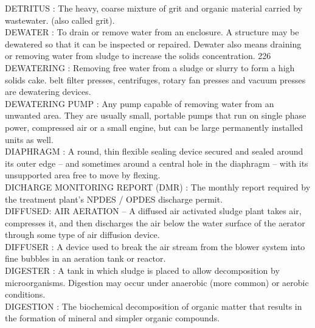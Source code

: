 \vspace{0.15cm}
DETRITUS :    The heavy, coarse mixture of grit and organic material carried by wastewater. (also called grit).\\
\vspace{0.15cm}
DEWATER :  To drain or remove water from an enclosure. A structure may be dewatered so that it can be inspected or repaired. Dewater also means draining or removing water from sludge to increase the solids concentration. 226 \\
\vspace{0.15cm}
DEWATERING :  Removing free water from a sludge or slurry to form a high solids cake. belt filter presses, centrifuges, rotary fan presses and vacuum presses are dewatering devices.\\
\vspace{0.15cm}
DEWATERING PUMP :   Any pump capable of removing water from an unwanted area. They are usually small, portable pumps that run on single phase power, compressed air or a small engine, but can be large permanently installed units as well.\\
\vspace{0.15cm}
DIAPHRAGM :   A round, thin flexible sealing device secured and sealed around its outer edge – and sometimes around a central hole in the diaphragm – with its unsupported area free to move by flexing.\\
\vspace{0.15cm}
DICHARGE MONITORING REPORT (DMR) :  The monthly report required by the treatment plant’s NPDES / OPDES discharge permit. \\
\vspace{0.15cm}
DIFFUSED: AIR AERATION – A diffused air activated sludge plant takes air, compresses it, and then discharges the air below the water surface of the aerator through some type of air diffusion device.\\
\vspace{0.15cm}
DIFFUSER :  A device used to break the air stream from the blower system into fine bubbles in an aeration tank or reactor.\\
\vspace{0.15cm}
DIGESTER :  A tank in which sludge is placed to allow decomposition by microorganisms. Digestion may occur under anaerobic (more common) or aerobic conditions.\\
\vspace{0.15cm}
DIGESTION :   The biochemical decomposition of organic matter that results in the formation of mineral and simpler organic compounds.\\
